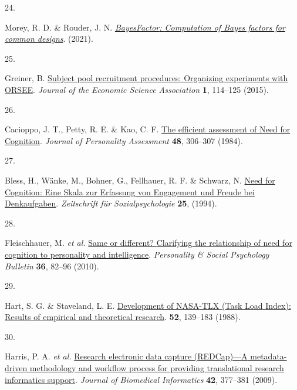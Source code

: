 \documentclass[
  man,floatsintext]{apa6}
\newlength{\cslhangindent}
\newlength{\csllabelwidth}
\newlength{\cslentryspacingunit} %
\newenvironment{CSLReferences}[2] %
 {%
  \setlength{\parindent}{0pt}
  \ifodd #1
  \let\oldpar\par
  \def\par{\hangindent=\cslhangindent\oldpar}
  \fi
  \setlength{\parskip}{#2\cslentryspacingunit}
 }%
 {}
\newcommand{\CSLLeftMargin}[1]{\parbox[t]{\csllabelwidth}{#1}}
\newcommand{\CSLRightInline}[1]{\parbox[t]{\linewidth - \csllabelwidth}{#1}\break}
\begin{document}
\begin{CSLReferences}{0}{0}
\leavevmode{}%
\CSLLeftMargin{24. }%
\CSLRightInline{Morey, R. D. \& Rouder, J. N. \emph{\href{https://CRAN.R-project.org/package=BayesFactor}{{BayesFactor}: {Computation} of {Bayes} factors for common designs}}. (2021).}

\leavevmode{}%
\CSLLeftMargin{25. }%
\CSLRightInline{Greiner, B. \href{https://doi.org/10.1007/s40881-015-0004-4}{Subject pool recruitment procedures: {Organizing} experiments with {ORSEE}}. \emph{Journal of the Economic Science Association} \textbf{1}, 114--125 (2015).}

\leavevmode{}%
\CSLLeftMargin{26. }%
\CSLRightInline{Cacioppo, J. T., Petty, R. E. \& Kao, C. F. \href{https://doi.org/10.1207/s15327752jpa4803_13}{The efficient assessment of {Need} for {Cognition}}. \emph{Journal of Personality Assessment} \textbf{48}, 306--307 (1984).}

\leavevmode{}%
\CSLLeftMargin{27. }%
\CSLRightInline{Bless, H., Wänke, M., Bohner, G., Fellhauer, R. F. \& Schwarz, N. \href{https://doi.org/1779110}{Need for {Cognition}: {Eine} {Skala} zur {Erfassung} von {Engagement} und {Freude} bei {Denkaufgaben}}. \emph{Zeitschrift für Sozialpsychologie} \textbf{25}, (1994).}

\leavevmode{}%
\CSLLeftMargin{28. }%
\CSLRightInline{Fleischhauer, M. \emph{et al.} \href{https://doi.org/10.1177/0146167209351886}{Same or different? {Clarifying} the relationship of need for cognition to personality and intelligence}. \emph{Personality \& Social Psychology Bulletin} \textbf{36}, 82--96 (2010).}

\leavevmode{}%
\CSLLeftMargin{29. }%
\CSLRightInline{Hart, S. G. \& Staveland, L. E. \href{https://doi.org/10.1016/S0166-4115(08)62386-9}{Development of {NASA}-{TLX} ({Task} {Load} {Index}): {Results} of empirical and theoretical research}. \textbf{52}, 139--183 (1988).}

\leavevmode{}%
\CSLLeftMargin{30. }%
\CSLRightInline{Harris, P. A. \emph{et al.} \href{https://doi.org/10.1016/j.jbi.2008.08.010}{Research electronic data capture ({REDCap})---{A} metadata-driven methodology and workflow process for providing translational research informatics support}. \emph{Journal of Biomedical Informatics} \textbf{42}, 377--381 (2009).}


\end{CSLReferences}
\end{document}
